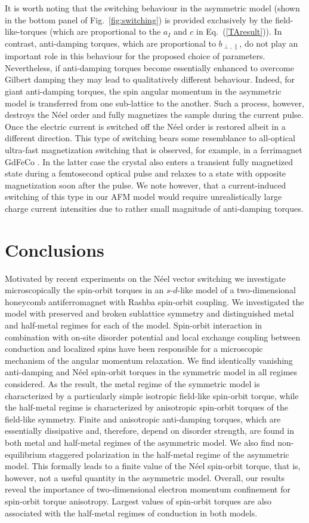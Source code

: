 It is worth noting that the switching behaviour in the asymmetric model (shown in the bottom panel of Fig.~\ref{fig:switching}) is provided exclusively by the field-like-torques (which are proportional to the $a_I$ and $c$ in Eq.~(\ref{TAresult})). In contrast, anti-damping torques, which are proportional to $b_{\perp,\parallel}$, do not play an important role in this behaviour for the proposed choice of parameters. Nevertheless, if anti-damping torques become essentially enhanced to overcome Gilbert damping they may lead to qualitatively different behaviour. Indeed, for giant anti-damping torques, the spin angular momentum in the asymmetric model is transferred from one sub-lattice to the another. Such a process, however, destroys the N\'eel order and fully magnetizes the sample during the current pulse. Once the electric current is switched off the N\'eel order is restored albeit in a different direction. This type of switching bears some resemblance to all-optical ultra-fast magnetization switching that is observed, for example, in a ferrimagnet GdFeCo \cite{RevModPhys.82.2731}. In the latter case the crystal also enters a transient fully magnetized state during a femtosecond optical pulse and relaxes to a state with opposite magnetization soon after the pulse.  We note however, that a current-induced switching of this type in our AFM model would require unrealistically large charge current intensities due to rather small magnitude of anti-damping torques. 

\section{Conclusions}

Motivated by recent experiments on the N\'eel vector switching we investigate microscopically the spin-orbit torques in an $s$-$d$-like model of a two-dimensional honeycomb antiferromagnet with Rashba spin-orbit coupling. We investigated the model with preserved and broken sublattice symmetry and distinguished metal and half-metal regimes for each of the model. Spin-orbit interaction in combination with on-site disorder potential and local exchange coupling between conduction and localized spins have been responsible for a microscopic mechanism of the angular momentum relaxation. We find identically vanishing anti-damping and N\'eel spin-orbit torques in the symmetric model in all regimes considered. As the result, the metal regime of the symmetric model is characterized by a particularly simple isotropic field-like spin-orbit torque, while the half-metal regime is characterized by anisotropic spin-orbit torques of the field-like symmetry.  Finite and anisotropic anti-damping torques, which are essentially dissipative and, therefore, depend on disorder strength, are found in both metal and half-metal regimes of the asymmetric model. We also find non-equilibrium staggered polarization in the half-metal regime of the asymmetric model. This formally leads to a finite value of the N\'eel spin-orbit torque, that is, however, not a useful quantity in the asymmetric model.  Overall, our results reveal the importance of two-dimensional electron momentum confinement for spin-orbit torque anisotropy. Largest values of spin-orbit torques are also associated with the half-metal regimes of conduction in both models. 